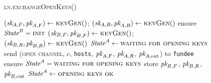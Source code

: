 \begin{figure}[H]
  \begin{processbox}{\textsc{ln.exchangeOpenKeys}()}
    \begin{algorithmic}[1]
      \State $(\textit{sk}_{A, F}, \textit{pk}_{A, F}) \gets \textsc{keyGen}()$;
      $(\textit{sk}_{A, R}, \textit{pk}_{A, R}) \gets \textsc{keyGen}()$
        \State ensure $\textit{State}^B = \textsc{init}$
        \State $(\textit{sk}_{B, F}, \textit{pk}_{B, F}) \gets \textsc{keyGen}()$; $(\textit{sk}_{B, R},
        \textit{pk}_{B, R}) \gets \textsc{keyGen}()$
      \Else \: 
        \State $\textit{State}^A \gets \textsc{waiting for opening keys}$
        \State send (\textsc{open channel}, $c$, \texttt{hosts}, $\textit{pk}_{A, F}$,
        $\textit{pk}_{A, R}$, $\textit{pk}_{A, \mathrm{out}}$) to \texttt{fundee}
        \State {}
        \State {}
        \State {}
        \State {}
         
          \State {}
        \Else \: 
          \State {}
        \EndIf
        \State {}
        \State ensure $\textit{State}^A = \textsc{waiting for opening keys}$
        \State store $\textit{pk}_{B, F}$, $\textit{pk}_{B, R}$, $\textit{pk}_{B, \mathrm{out}}$
        \State $\textit{State}^A \gets \textsc{opening keys ok}$
      \EndIf
    \end{algorithmic}
  \end{processbox}
  \caption{}
  \label{code:ln:exchange-open-keys}
\end{figure}

